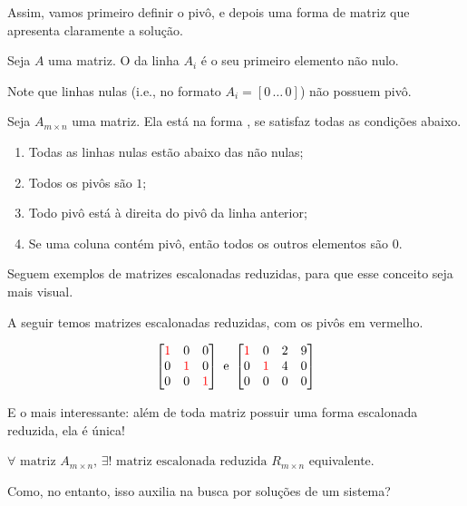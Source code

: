 \documentclass[../main.tex]{subfiles}
\begin{document}
			Assim, vamos primeiro definir o pivô, e depois uma forma de matriz que apresenta claramente a solução.
			\begin{definicao}
				Seja $A$ uma matriz. O  da linha $A_i$ é o seu primeiro elemento não nulo.
			\end{definicao}
			Note que linhas nulas (i.e., no formato $A_i=[0\, \dots\, 0]$) não possuem pivô.
			\begin{definicao}
				Seja $A_{m\times n}$ uma matriz. Ela está na forma , se satisfaz todas as condições abaixo.
				\begin{enumerate}[label=\roman*)]
					\item Todas as linhas nulas estão abaixo das não nulas;
					\item Todos os pivôs são $1$;
					\item Todo pivô está à direita do pivô da linha anterior;
					\item Se uma coluna contém pivô, então todos os outros elementos são $0$.
				\end{enumerate}
			\end{definicao}
			Seguem exemplos de matrizes escalonadas reduzidas, para que esse conceito seja mais visual.
			\begin{exemplo}
				A seguir temos matrizes escalonadas reduzidas, com os pivôs em vermelho.
				
				\[
				\begin{bmatrix}
					{\color{red}1} & 0 & 0\\
					0 & {\color{red}1} & 0\\
					0 & 0 & {\color{red}1}
				\end{bmatrix}
				\text{ e } 
				\begin{bmatrix}
					{\color{red}1} & 0 & 2 & 9\\
					0 & {\color{red}1} & 4 & 0\\
					0 & 0 & 0 & 0
				\end{bmatrix}
				\]
				\label{ex:matrizes}
			\end{exemplo}
			E o mais interessante: além de toda matriz possuir uma forma escalonada reduzida, ela é única!
			
			\begin{teorema}
				$\forall \text{ matriz }  A_{m\times n},\, \exists! \text{ matriz escalonada reduzida } R_{m\times n}$ equivalente.
			\end{teorema}
			
			Como, no entanto, isso auxilia na busca por soluções de um sistema?
			
\end{document}

